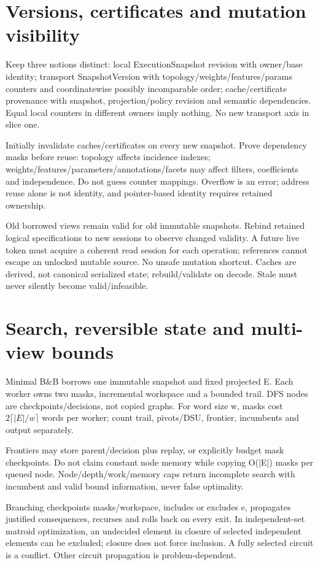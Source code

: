 \documentclass[10pt,a4paper]{article}
\begin{document}
\section{Versions, certificates and mutation visibility}
\label{sec:versions}
Keep three notions distinct: local ExecutionSnapshot revision with owner/base identity; transport SnapshotVersion with topology/weights/features/params counters and coordinatewise possibly incomparable order; cache/certificate provenance with snapshot, projection/policy revision and semantic dependencies. Equal local counters in different owners imply nothing. No new transport axis in slice one.

Initially invalidate caches/certificates on every new snapshot. Prove dependency masks before reuse: topology affects incidence indexes; weights/features/parameters/annotations/facets may affect filters, coefficients and independence. Do not guess counter mappings. Overflow is an error; address reuse alone is not identity, and pointer-based identity requires retained ownership.

Old borrowed views remain valid for old immutable snapshots. Rebind retained logical specifications to new sessions to observe changed validity. A future live token must acquire a coherent read session for each operation; references cannot escape an unlocked mutable source. No unsafe mutation shortcut. Caches are derived, not canonical serialized state; rebuild/validate on decode. Stale must never silently become valid/infeasible.

\section{Search, reversible state and multi-view bounds}
\label{sec:search}
Minimal B\&B borrows one immutable snapshot and fixed projected E. Each worker owns two masks, incremental workspace and a bounded trail. DFS nodes are checkpoints/decisions, not copied graphs. For word size w, masks cost $2\lceil|E|/w\rceil$ words per worker; count trail, pivots/DSU, frontier, incumbents and output separately.

Frontiers may store parent/decision plus replay, or explicitly budget mask checkpoints. Do not claim constant node memory while copying O(|E|) masks per queued node. Node/depth/work/memory caps return incomplete search with incumbent and valid bound information, never false optimality.

Branching checkpoints masks/workspace, includes or excludes e, propagates justified consequences, recurses and rolls back on every exit. In independent-set matroid optimization, an undecided element in closure of selected independent elements can be excluded; closure does not force inclusion. A fully selected circuit is a conflict. Other circuit propagation is problem-dependent.
\end{document}

